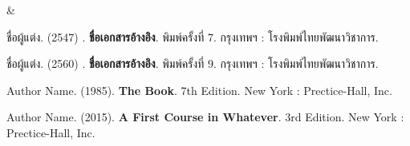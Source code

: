 \begin{weeklyplan}

\thewlec & 
\\ \hline

\end{weeklyplan}

\begin{bibliography}
\item ชื่อผู้แต่ง. (2547)	. \textbf{ชื่อเอกสารอ้างอิง}. พิมพ์ครั้งที่ 7.  กรุงเทพฯ : โรงพิมพ์ไทยพัฒนาวิชาการ.
\item ชื่อผู้แต่ง. (2560)	. \textbf{ชื่อเอกสารอ้างอิง}. พิมพ์ครั้งที่ 9.  กรุงเทพฯ : โรงพิมพ์ไทยพัฒนาวิชาการ.
\item Author Name. (1985). \textbf{The Book}. 7th Edition.  New York : Prectice-Hall, Inc.
\item Author Name. (2015). \textbf{A First Course in Whatever}. 3rd Edition.  New York : Prectice-Hall, Inc.
\end{bibliography}
